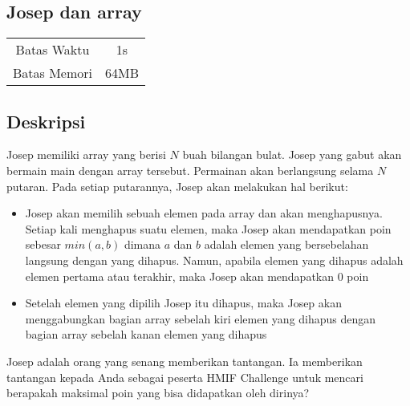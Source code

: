 \documentclass{article}
\begin{document}
\begin{center}
    \section*{Josep dan array} %

    \begin{tabular}{ | c c | }
        \hline
        Batas Waktu  & 1s \\    %
        Batas Memori & 64MB \\  %
        \hline
    \end{tabular}
\end{center}

\subsection*{Deskripsi}



Josep memiliki array yang berisi $N$ buah bilangan bulat. Josep yang gabut akan bermain main 
dengan array tersebut. Permainan akan berlangsung selama $N$ putaran. Pada setiap putarannya, 
Josep akan melakukan hal berikut:
\begin{itemize}
    \item Josep akan memilih sebuah elemen pada array dan akan menghapusnya. Setiap kali menghapus
    suatu elemen, maka Josep akan mendapatkan poin sebesar $min(a, b)$ dimana $a$ dan $b$ adalah 
    elemen yang bersebelahan langsung dengan yang dihapus. Namun, apabila elemen yang dihapus adalah elemen pertama atau 
    terakhir, maka Josep akan mendapatkan 0 poin
    
    \item Setelah elemen yang dipilih Josep itu dihapus, maka Josep akan menggabungkan bagian array sebelah kiri 
    elemen yang dihapus dengan bagian array sebelah kanan elemen yang dihapus
\end{itemize}

Josep adalah orang yang senang memberikan tantangan. Ia memberikan tantangan kepada Anda sebagai peserta HMIF
Challenge untuk mencari berapakah maksimal poin yang bisa didapatkan oleh dirinya?

\end{document}
